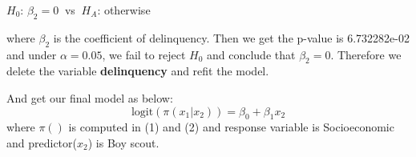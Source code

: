 \documentclass[11pt]{article}
\begin{document}
\(H_0\): \(\beta_2=0~\) vs \(~H_A\): otherwise

where \(\beta_2\) is the coefficient of delinquency. Then we get the
p-value is 6.732282e-02 and under \(\alpha=0.05\), we fail to reject
\(H_0\) and conclude that \(\beta_2=0\). Therefore we delete the
variable \textbf{delinquency} and refit the model.

    And get our final model as below:
\[\text{logit}(\pi(x_1|x_2)) = \beta_0 + \beta_1x_2\] where \(\pi()\) is
computed in (1) and (2) and response variable is Socioeconomic and
predictor(\(x_2\)) is Boy scout.


    
    
    
    
\end{document}
